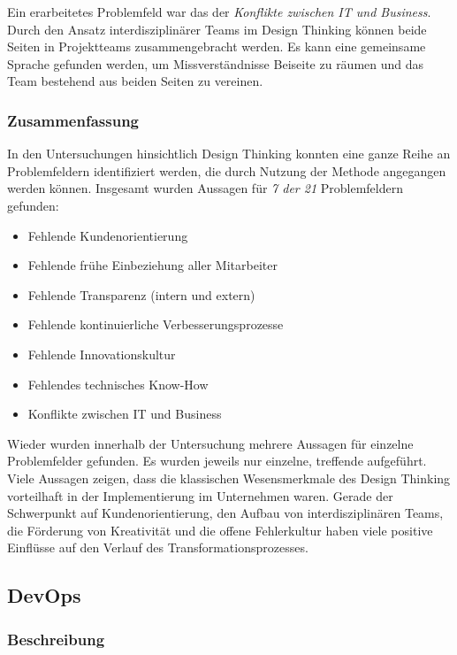 Ein erarbeitetes Problemfeld war das der \textit{Konflikte zwischen IT und Business}. Durch den Ansatz interdisziplinärer Teams im Design Thinking können beide Seiten in Projektteams zusammengebracht werden. Es kann eine gemeinsame Sprache gefunden werden, um Missverständnisse Beiseite 
zu räumen und das Team bestehend aus beiden Seiten zu vereinen.

\subsubsection{Zusammenfassung}

In den Untersuchungen hinsichtlich Design Thinking konnten eine ganze Reihe an Problemfeldern identifiziert werden, die durch Nutzung der Methode angegangen werden können. Insgesamt wurden Aussagen für \textit{7 der 21} Problemfeldern gefunden:

\begin{itemize}[noitemsep, topsep=0pt]
	\item Fehlende Kundenorientierung
	\item Fehlende frühe Einbeziehung aller Mitarbeiter
	\item Fehlende Transparenz (intern und extern)
	\item Fehlende kontinuierliche Verbesserungsprozesse
	\item Fehlende Innovationskultur
	\item Fehlendes technisches Know-How
	\item Konflikte zwischen IT  und Business
\end{itemize}

Wieder wurden innerhalb der Untersuchung mehrere Aussagen für einzelne Problemfelder gefunden. Es wurden jeweils nur einzelne, treffende aufgeführt. Viele Aussagen zeigen, dass die klassischen Wesensmerkmale des Design Thinking vorteilhaft in der Implementierung im Unternehmen waren. Gerade der Schwerpunkt auf Kundenorientierung, den Aufbau von interdisziplinären Teams, die Förderung von Kreativität und die offene Fehlerkultur haben viele positive Einflüsse auf den Verlauf des Transformationsprozesses.
 
\subsection{DevOps}

\subsubsection{Beschreibung}

